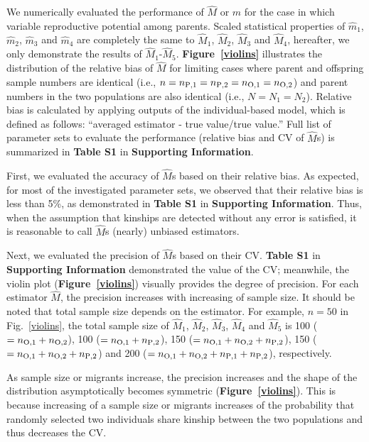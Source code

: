 \documentclass[12pt, English]{article}
\begin{document}
\begin{spacing}{1.9}
We numerically evaluated the performance of ${\hat M}$ or ${\hat m}$ for the case in which variable reproductive potential among parents. Scaled statistical properties of ${\hat m_1}$,  ${\hat m_2}$,  ${\hat m_3}$ and ${\hat m_4}$ are completely the same to ${\hat M_1}$, ${\hat M_2}$, ${\hat M_3}$ and ${\hat M_4}$, hereafter, we only demonstrate the results of ${\hat M_1}$-${\hat M_5}$. {\bf Figure~\ref{violins}} illustrates the distribution of the relative bias of ${\hat M}$ for limiting cases where parent and offspring sample numbers are identical (i.e., $n=n_{\rm P,1}=n_{\rm P,2}=n_{\rm O,1}= n_{\rm O,2}$) and parent numbers in the two populations are also identical (i.e., $N=N_1=N_2$). Relative bias is calculated by applying outputs of the individual-based model, which is defined as follows: ``averaged estimator - true value/true value.'' Full list of parameter sets to evaluate the performance (relative bias and CV of ${\hat M}$s) is summarized in {\bf Table S1} in {\bf Supporting Information}. 
 
\begin{center}
\end{center}

First, we evaluated the accuracy of ${\hat M}$s based on their relative bias. As expected, for most of the investigated parameter sets, we observed that their relative bias is less than 5\%, as demonstrated in {\bf Table S1} in {\bf Supporting Information}. Thus, when the assumption that kinships are detected without any error is satisfied, it is reasonable to call ${\hat M}$s (nearly) unbiased estimators. 

Next, we evaluated the precision of ${\hat M}$s based on their CV. {\bf Table S1} in {\bf Supporting Information} demonstrated the value of the CV; meanwhile, the violin plot ({\bf Figure~\ref{violins}}) visually provides the degree of precision. For each estimator ${\hat M}$, the precision increases with increasing of sample size. It should be noted that total sample size depends on the estimator. For example, $n=50$ in Fig.~\ref{violins}, the total sample size of ${\hat M_1}$, ${\hat M_2}$, ${\hat M_3}$, ${\hat M_4}$ and ${\hat M_5}$ is 100 ($=n_{\rm O,1}+n_{\rm O,2}$), 100 ($=n_{\rm O,1}+n_{\rm P,2}$), 150 ($=n_{\rm O,1}+n_{\rm O,2}+n_{\rm P,2}$), 150 ($=n_{\rm O,1}+n_{\rm O,2}+n_{\rm P,2}$) and 200 ($=n_{\rm O,1}+n_{\rm O,2}+n_{\rm P,1}+n_{\rm P,2}$), respectively. 

As sample size or migrants increase, the precision increases and the shape of the distribution asymptotically becomes symmetric ({\bf Figure~\ref{violins}}). This is because increasing of a sample size or migrants increases of the probability that randomly selected two individuals share kinship between the two populations and thus decreases the CV. 


\end{spacing}
\end{document}
